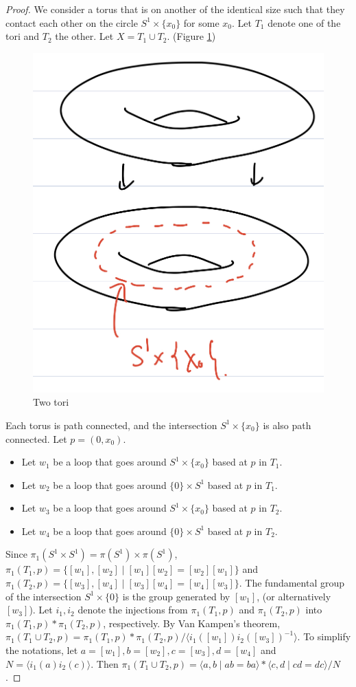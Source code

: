 \documentclass[12pt, psamsfonts]{amsart}
\theoremstyle{definition}
\theoremstyle{remark}
\numberwithin{equation}{section}
\begin{document}
\begin{proof}
  We consider a torus that is on another of the identical size such that they contact each other on the circle $S^1 \times \{ x_0 \}$ for some $x_0$.
  Let $T_1$ denote one of the tori and $T_2$ the other.
  Let $X = T_1 \cup T_2$.
  (Figure \ref{fig:tori})
  \begin{figure}
    \includegraphics[width=.5\linewidth]{two-tori.jpeg}
      \caption{Two tori}
    \label{fig:tori}
  \end{figure}
  Each torus is path connected, and the intersection $S^1 \times \{ x_0 \}$ is also path connected.
  Let $p = (0, x_0)$.
  \begin{itemize}
    \item
      Let $w_1$ be a loop that goes around $S^1 \times \{ x_0 \}$ based at $p$ in $T_1$.
    \item
      Let $w_2$ be a loop that goes around $\{ 0 \} \times S^1$ based at $p$ in $T_1$.
    \item
      Let $w_3$ be a loop that goes around $S^1 \times \{ x_0 \}$ based at $p$ in $T_2$.
    \item
      Let $w_4$ be a loop that goes around $\{ 0 \} \times S^1$ based at $p$ in $T_2$.
  \end{itemize}
  Since $\pi_1(S^1 \times S^1) = \pi(S^1) \times \pi(S^1)$, $\pi_1(T_1, p) = \{ [w_1], [w_2] \mid [w_1][w_2] = [w_2][w_1]\}$ and $\pi_1(T_2, p) = \{ [w_3], [w_4] \mid [w_3][w_4] = [w_4][w_3]\}$.
  The fundamental group of the intersection $S^1 \times \{ 0 \}$ is the group generated by $[w_1]$, (or alternatively $[w_3]$).
  Let $i_1, i_2$ denote the injections from $\pi_1(T_1, p)$ and $\pi_1(T_2, p)$ into $\pi_1(T_1, p) * \pi_1(T_2, p)$, respectively.
  By Van Kampen's theorem, $\pi_1(T_1 \cup T_2, p) = \pi_1(T_1, p) * \pi_1(T_2, p) / \langle i_1([w_1])i_2([w_3])^{-1} \rangle$.
  To simplify the notations, let $a = [w_1], b = [w_2], c = [w_3], d = [w_4]$ and $N = \langle i_1(a)i_2(c) \rangle$.
  Then $\pi_1(T_1 \cup T_2, p) = \langle a, b \mid ab = ba \rangle * \langle c, d \mid cd = dc \rangle / N$.


\end{proof}
\end{document}
